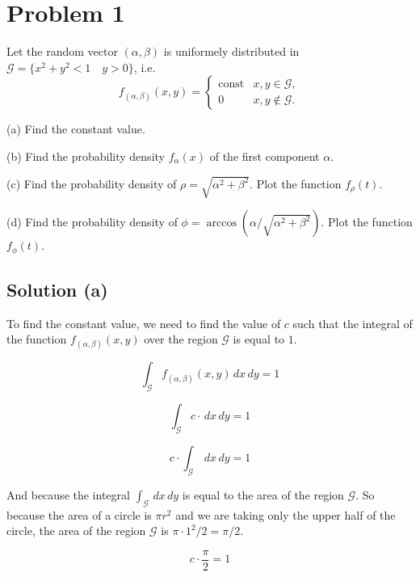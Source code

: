 \section*{Problem 1}

Let the random vector $(\alpha, \beta)$ is uniformely distributed in $\mathcal{G} = \{x^2 + y^2 < 1\quad y > 0 \}$, i.e.
\[
    f_{(\alpha, \beta)}(x, y) =
    \begin{cases}
        \text{const} & x, y \in \mathcal{G},    \\
        0            & x, y \notin \mathcal{G}.
    \end{cases}
\]

(a) Find the constant value.

(b) Find the probability density $f_\alpha(x)$ of the first component $\alpha$.

(c) Find the probability density of $\rho = \sqrt{\alpha^2 + \beta^2}$. Plot the function $f_\rho(t)$.

(d) Find the probability density of $\phi = \arccos(\alpha/\sqrt{\alpha^2 + \beta^2})$. Plot the function $f_\phi(t)$.

\subsection*{Solution (a)}

To find the constant value, we need to find the value of $c$ such that the integral of the function $f_{(\alpha, \beta)}(x, y)$ over the region $\mathcal{G}$ is equal to $1$.

\begin{equation}
    \int_{\mathcal{G}} f_{(\alpha, \beta)}(x, y) \, dx \, dy = 1
\end{equation}

\begin{equation}
    \int_{\mathcal{G}} c \cdot \, dx \, dy = 1
\end{equation}

\begin{equation}
    c \cdot  \int_{\mathcal{G}}\, dx \, dy = 1
\end{equation}

And because the integral $ \int_{\mathcal{G}}\, dx \, dy$ is equal
to the area of the region $\mathcal{G}$. So because the area of
a circle is $\pi r^2$ and we are taking only the upper half of the circle,
the area of the region $\mathcal{G}$ is $\pi \cdot 1^2 / 2 = \pi / 2$.

\begin{equation}
    c \cdot \frac{\pi}{2} = 1
\end{equation}

